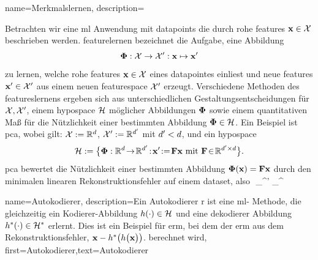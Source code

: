 {{
{name={Merkmalslernen},
	description={Betrachten wir eine  \gls{ml} Anwendung mit  \glspl{datapoint} die durch rohe  \glspl{feature} $\featurevec \in \featurespace$ beschrieben 
		werden. \Gls{feature}lernen  bezeichnet die Aufgabe, eine Abbildung
		$$\featuremapvec: \featurespace \rightarrow \featurespace': \featurevec \mapsto \featurevec'$$ 
		zu lernen, welche rohe \glspl{feature} $\featurevec \in \featurespace$ eines \gls{datapoint}es einliest 
		und neue \glspl{feature} $\featurevec' \in \featurespace'$ aus einem neuen \gls{featurespace} 
		$\featurespace'$ erzeugt. Verschiedene Methoden des \gls{feature}slernens ergeben sich aus unterschiedlichen 
		Gestaltungsentscheidungen für $\featurespace,\featurespace'$,  einem \gls{hypospace} $\hypospace$ möglicher Abbildungen $\featuremapvec$
		sowie einem quantitativen Maß für die Nützlichkeit einer bestimmten Abbildung  $\featuremapvec \in \hypospace$.
		Ein Beispiel ist \gls{pca}, wobei gilt: 
		$\featurespace \defeq \mathbb{R}^{\dimlocalmodel}$, $\featurespace' \defeq \mathbb{R}^{\dimlocalmodel'}$ 
		mit $\dimlocalmodel' < \dimlocalmodel$, und ein \gls{hypospace}
		$$\hypospace\defeq \big\{ \featuremapvec: \mathbb{R}^{\dimlocalmodel}
		\!\rightarrow\! \mathbb{R}^{\dimlocalmodel'}\!:\!\featurevec'\!\defeq\!\mF \featurevec \mbox{ mit } \mF \!\in\! \mathbb{R}^{\dimlocalmodel' \times \dimlocalmodel} \big\}.$$
		\Gls{pca} bewertet die Nützlichkeit einer bestimmten Abbildung $\featuremapvec(\featurevec)= \mF \featurevec$ 
		durch den \gls{minimalen} linearen Rekonstruktionsfehler auf einem \gls{dataset}, also
		$$ \min_{\mG \in {}^{\dimlocalmodel \times \dimlocalmodel'}} \sum_{}^{\samplesize}  


{name={Autokodierer}},
	description={Ein Autokodierer r ist eine \gls{ml}- Methode, die gleichzeitig ein Kodierer-Abbildung 
		$h(\cdot) \in \mathcal{H}$  und eine dekodierer Abbildung  $h^{*}(\cdot) \in \mathcal{H}^{*}$ erlernt. 
		Dies ist ein Beispiel für \gls{erm}, bei dem der \gls{erm}  aus dem Rekonstruktionsfehler, ${\bf x} - h^{*}\big(  h \big( {\bf x} \big) \big)$. berechnet wird},
	first={Autokodierer},text={Autokodierer}
} 

}}}
